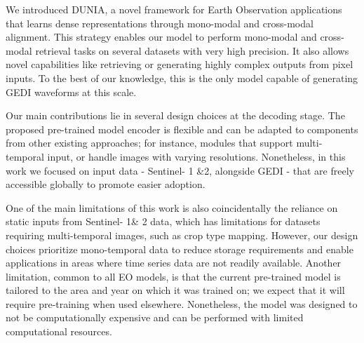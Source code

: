 We introduced DUNIA, a novel framework for Earth Observation applications that learns dense representations through mono-modal and cross-modal alignment. This strategy enables our model to perform mono-modal and cross-modal retrieval tasks on several datasets with very high precision. It also allows novel capabilities like retrieving or generating highly complex outputs from pixel inputs. To the best of our knowledge, this is the only model capable of generating GEDI waveforms at this scale. 

Our main contributions lie in several design choices at the decoding stage. The proposed pre-trained model encoder is flexible and can be adapted to components from other existing approaches; for instance, modules that support multi-temporal input, or handle images with varying resolutions. Nonetheless, in this work we focused on input data - Sentinel- 1 \&2, alongside GEDI - that are freely accessible globally to promote easier adoption.   

One of the main limitations of this work is also coincidentally the reliance on static inputs from Sentinel- 1\& 2 data, which has limitations for datasets requiring multi-temporal images, such as crop type mapping. However, our design choices prioritize mono-temporal data to reduce storage requirements and enable applications in areas where time series data are not readily available. Another limitation, common to all EO models, is that the current pre-trained model is tailored to the area and year on which it was trained on; we expect that it will require pre-training when used elsewhere. Nonetheless, the model was designed to not be computationally expensive and can be performed with limited computational resources.